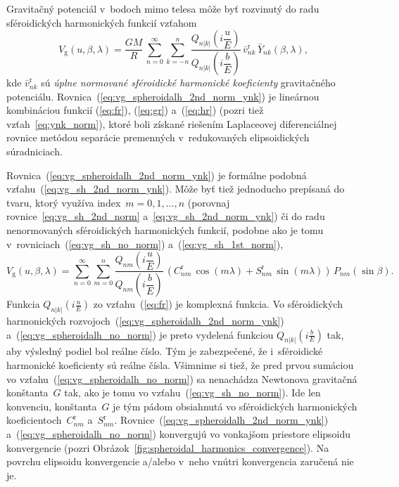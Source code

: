 \documentclass[a4paper,12pt]{book}
\newcommand{\gidx}{\mathrm g}
\begin{document}
Gravitačný potenciál v~bodoch mimo telesa môže byť rozvinutý do radu 
sféroidických harmonických funkcií vzťahom \parencite{MoritzPhysicalGeodesy}
%
\begin{equation}
\label{eq:vg_spheroidalh_2nd_norm_ynk}
V_\gidx(u, \beta, \lambda) = \frac{GM}{R} \, \sum_{n = 0}^\infty \sum_{k 
= -n}^n \frac{Q_{n|k|}\left( i \dfrac{u}{E} \right)}{Q_{n|k|}\left( 
i \dfrac{b}{E} \right)} \, \bar{v}^{\mathrm{r}}_{nk} \, \bar{Y}_{nk}(\beta, 
\lambda){,}
\end{equation}
%
kde $\bar{v}_{nk}^\mathrm{r}$ sú \emph{úplne normované sféroidické harmonické 
koeficienty} gravitačného potenciálu.  
Rovnica~(\ref{eq:vg_spheroidalh_2nd_norm_ynk}) je lineárnou kombináciou funkcií 
(\ref{eq:fr}), (\ref{eq:gr}) a~(\ref{eq:hr}) (pozri tiež 
vzťah~\ref{eq:ynk_norm}), ktoré boli získané riešením Laplaceovej 
diferenciálnej rovnice metódou separácie premenných v~redukovaných 
elipsoidických súradniciach.

Rovnica~(\ref{eq:vg_spheroidalh_2nd_norm_ynk}) je formálne podobná 
vzťahu~(\ref{eq:vg_sh_2nd_norm_ynk}).  Môže byť tiež jednoducho prepísaná do 
tvaru, ktorý využíva index~$m = 0, 1, \dots, n$ (porovnaj 
rovnice~\ref{eq:vg_sh_2nd_norm} a~\ref{eq:vg_sh_2nd_norm_ynk}) či do radu 
nenormovaných sféroidických harmonických funkcií, podobne ako je tomu 
v~rovniciach~(\ref{eq:vg_sh_no_norm}) a~(\ref{eq:vg_sh_1st_norm}),
%
\begin{equation}
\label{eq:vg_spheroidalh_no_norm}
V_\gidx(u, \beta, \lambda) = \sum_{n = 0}^\infty \sum_{m = 0}^n 
\frac{Q_{nm}\left( i \dfrac{u}{E} \right)}{Q_{nm}\left( i \dfrac{b}{E} \right)} 
\, \left( C^{\mathrm{r}}_{nm} \, \cos(m\lambda) + S^{\mathrm{r}}_{nm} \, 
\sin(m\lambda) \right) \, P_{nm}(\sin\beta){.}
\end{equation}
%
Funkcia $Q_{n|k|}\left( i \frac{u}{E} \right)$ zo vzťahu~(\ref{eq:fr}) je 
komplexná funkcia.  Vo sféroidických harmonických 
rozvojoch~(\ref{eq:vg_spheroidalh_2nd_norm_ynk}) 
a~(\ref{eq:vg_spheroidalh_no_norm}) je preto vydelená funkciou $Q_{n|k|}\left( 
i \frac{b}{E} \right)$ tak, aby výsledný podiel bol reálne číslo.  Tým je 
zabezpečené, že i~sféroidické harmonické koeficienty sú reálne čísla.  Všimnime 
si tiež, že pred prvou sumáciou vo vzťahu~(\ref{eq:vg_spheroidalh_no_norm}) sa 
nenachádza Newtonova gravitačná konštanta~$G$ tak, ako je tomu vo 
vzťahu~(\ref{eq:vg_sh_no_norm}).  Ide len konvenciu, konštanta~$G$ je tým pádom 
obsiahnutá vo sféroidických harmonických koeficientoch~$C_{nm}^\mathrm{r}$ 
a~$S_{nm}^\mathrm{r}$.  Rovnice~(\ref{eq:vg_spheroidalh_2nd_norm_ynk}) 
a~(\ref{eq:vg_spheroidalh_no_norm}) konvergujú vo vonkajšom priestore elipsoidu 
konvergencie (pozri Obrázok~\ref{fig:spheroidal_harmonics_convergence}).  Na 
povrchu elipsoidu konvergencie a/alebo v~neho vnútri konvergencia zaručená nie 
je.
\end{document}
